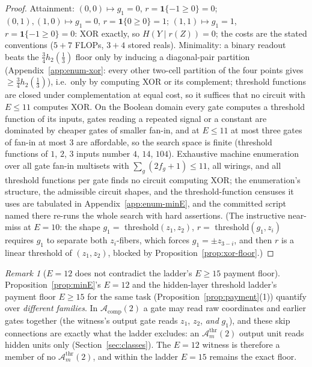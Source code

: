 \documentclass[twocolumn,10pt]{article}
\theoremstyle{definition}
\theoremstyle{remark}
\newtheorem{remark}[theorem]{Remark}
\newcommand{\cA}{\mathcal{A}}
\newcommand{\Athr}[1]{\cA^{\mathrm{thr}}_{#1}}
\newcommand{\hb}{h_2}
\begin{document}
\begin{proof}
Attainment: $(0,0) \mapsto g_1 = 0$, $r = \mathbf 1\{-1 \ge 0\} = 0$;
$(0,1), (1,0) \mapsto g_1 = 0$, $r = \mathbf 1\{0 \ge 0\} = 1$;
$(1,1) \mapsto g_1 = 1$, $r = \mathbf 1\{-1 \ge 0\} = 0$: XOR exactly,
so $H(Y \mid r(Z)) = 0$; the costs are the stated conventions
($5 + 7$ FLOPs, $3 + 4$ stored reals). Minimality: a binary readout beats
the $\tfrac34 \hb(\tfrac13)$ floor only by inducing a diagonal-pair
partition (Appendix~\ref{app:enum-xor}: every other two-cell partition of
the four points gives $\ge \tfrac34 \hb(\tfrac13)$), i.e.\ only by
computing XOR or its complement; threshold functions are closed under
complementation at equal cost, so it suffices that no circuit with
$E \le 11$ computes XOR. On the Boolean domain every gate computes a
threshold function of its inputs, gates reading a repeated signal or a
constant are dominated by cheaper gates of smaller fan-in, and at
$E \le 11$ at most three gates of fan-in at most $3$ are affordable, so
the search space is finite (threshold functions of $1$, $2$, $3$
inputs number $4$, $14$, $104$). Exhaustive machine enumeration over all
gate fan-in multisets with $\sum_g (2 f_g + 1) \le 11$, all wirings, and
all threshold functions per gate finds no circuit computing XOR; the
enumeration's structure, the admissible circuit shapes, and the
threshold-function censuses it uses are tabulated in
Appendix~\ref{app:enum-minE}, and the committed script named there
re-runs the whole search with hard assertions. (The
instructive near-miss at $E = 10$: the shape $g_1 =$
threshold$(z_1, z_2)$, $r =$ threshold$(g_1, z_i)$ requires $g_1$ to
separate both $z_i$-fibers, which forces $g_1 = \pm z_{3-i}$, and then
$r$ is a linear threshold of $(z_1, z_2)$, blocked by
Proposition~\ref{prop:xor-floor}.)
\end{proof}

\begin{remark}[$E = 12$ does not contradict the ladder's $E \ge 15$
payment floor]
\label{rem:family-disambig}
Proposition~\ref{prop:minE}'s $E = 12$ and the hidden-layer threshold
ladder's payment floor $E \ge 15$ for the same task
(Proposition~\ref{prop:payment}(1)) quantify over \emph{different
families}. In $\cA_{\mathrm{comp}}(2)$ a gate may read raw coordinates
and earlier gates together (the witness's output gate reads $z_1$,
$z_2$, \emph{and} $g_1$), and these skip connections are exactly what
the ladder excludes: an $\Athr{m}(2)$ output unit reads hidden units
only (Section~\ref{sec:classes}). The $E = 12$ witness is therefore a
member of no $\Athr{m}(2)$, and within the ladder $E = 15$ remains the
exact floor.
\end{remark}
\end{document}
